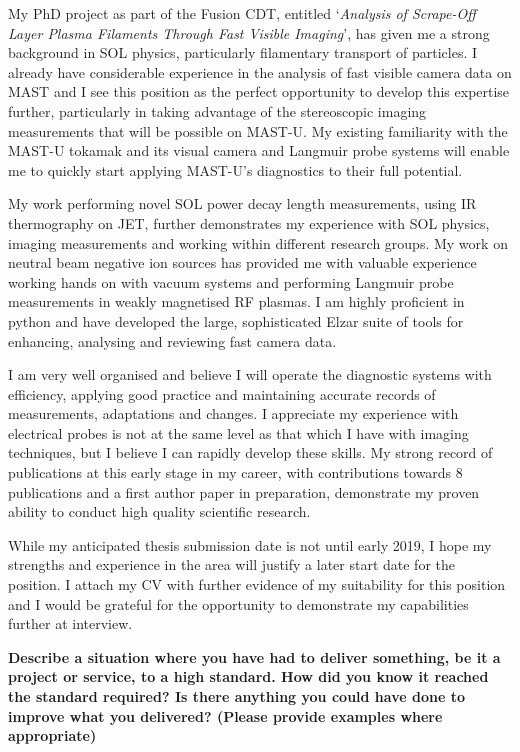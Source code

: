 \documentclass[11pt,a4paper,sans]{moderncv}        %
\begin{document}
My PhD project as part of the Fusion CDT, entitled `\textit{Analysis of Scrape-Off Layer Plasma Filaments Through Fast Visible Imaging}', has given me a strong background in SOL physics, particularly filamentary transport of particles.
I already have considerable experience in the analysis of fast visible camera data on MAST and I see this position as the perfect opportunity to develop this expertise further, particularly in taking advantage of the stereoscopic imaging measurements that will be possible on MAST-U.
My existing familiarity with the MAST-U tokamak and its visual camera and Langmuir probe systems will enable me to quickly start applying MAST-U's diagnostics to their full potential.

My work performing novel SOL power decay length measurements, using IR thermography on JET, further demonstrates my experience with SOL physics, imaging measurements and working within different research groups.
My work on neutral beam negative ion sources has provided me with valuable experience working hands on with vacuum systems and performing Langmuir probe measurements in weakly magnetised RF plasmas.
I am highly proficient in python and have developed the large, sophisticated Elzar suite of tools for enhancing, analysing and reviewing fast camera data.

I am very well organised and believe I will operate the diagnostic systems with efficiency, applying good practice and maintaining accurate records of measurements, adaptations and changes.
I appreciate my experience with electrical probes is not at the same level as that which I have with imaging techniques, but I believe I can rapidly develop these skills.
My strong record of publications at this early stage in my career, with contributions towards 8 publications and a first author paper in preparation, demonstrate my proven ability to conduct high quality scientific research.

While my anticipated thesis submission date is not until early 2019, I hope my strengths and experience in the area will justify a later start date for the position.
I attach my CV with further evidence of my suitability for this position and I would be grateful for the opportunity to demonstrate my capabilities further at interview. 

\makeletterclosing

\newpage
\textbf{Describe a situation where you have had to deliver something, be it a project or service, to a high standard. How did you know it reached the standard required? Is there anything you could have done to improve what you delivered? (Please provide examples where appropriate)	}
\end{document}
